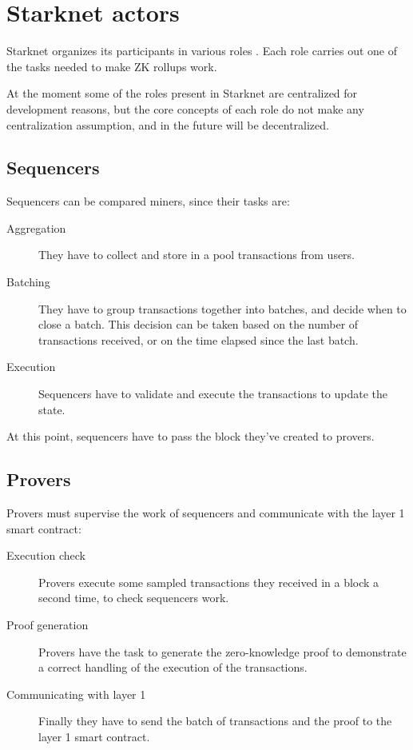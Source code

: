 \documentclass[12pt]{article}
\begin{document}
\section{Starknet actors} \label{section:starknet_actors}
Starknet organizes its participants in various roles \cite{starknet_actors}. Each role carries out one of the tasks needed to make ZK rollups work.

At the moment some of the roles present in Starknet are centralized for development reasons, but the core concepts of each role do not make any centralization assumption, and in the future will be decentralized.

\subsection{Sequencers} \label{subsection:sequencers}
Sequencers can be compared miners, since their tasks are:
\begin{description}
    \item[Aggregation] They have to collect and store in a pool transactions from users.
    \item[Batching] They have to group transactions together into batches, and decide when to close a batch. This decision can be taken based on the number of transactions received, or on the time elapsed since the last batch.
    \item[Execution]Sequencers have to validate and execute the transactions to update the state.
\end{description}

At this point, sequencers have to pass the block they've created to provers.

\subsection{Provers} \label{subsection:provers}
Provers must supervise the work of sequencers and communicate with the layer 1 smart contract:
\begin{description}
    \item[Execution check] Provers execute some sampled transactions they received in a block a second time, to check sequencers work.
    \item[Proof generation] Provers have the task to generate the zero-knowledge proof to demonstrate a correct handling of the execution of the transactions.
    \item[Communicating with layer 1] Finally they have to send the batch of transactions and the proof to the layer 1 smart contract.
\end{description}
\end{document}
